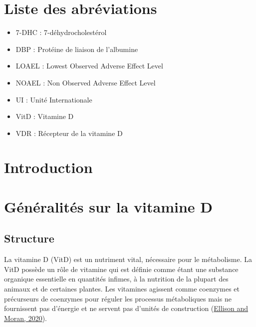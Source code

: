\documentclass[
  letterpaper,
  DIV=11,
  numbers=noendperiod]{scrartcl}
\providecommand{\tightlist}{%
  \setlength{\itemsep}{0pt}\setlength{\parskip}{0pt}}\usepackage{longtable,booktabs,array}
\begin{document}
\hypertarget{liste-des-abruxe9viations}{%
\section*{Liste des abréviations}\label{liste-des-abruxe9viations}}

\begin{itemize}
\tightlist
\item
  7-DHC : 7-déhydrocholestérol
\item
  DBP : Protéine de liaison de l'albumine
\item
  LOAEL : Lowest Observed Adverse Effect Level
\item
  NOAEL : Non Observed Adverse Effect Level
\item
  UI : Unité Internationale
\item
  VitD : Vitamine D
\item
  VDR : Récepteur de la vitamine D
\end{itemize}

\newpage{}

\hypertarget{introduction}{%
\section{Introduction}\label{introduction}}


\newpage{}

\hypertarget{guxe9nuxe9ralituxe9s-sur-la-vitamine-d}{%
\section{Généralités sur la vitamine
D}\label{guxe9nuxe9ralituxe9s-sur-la-vitamine-d}}

\hypertarget{structure}{%
\subsection{Structure}\label{structure}}

La vitamine D (VitD) est un nutriment vital, nécessaire pour le
métabolisme. La VitD possède un rôle de vitamine qui est définie comme
étant une substance organique essentielle en quantités infimes, à la
nutrition de la plupart des animaux et de certaines plantes. Les
vitamines agissent comme coenzymes et précurseurs de coenzymes pour
réguler les processus métaboliques mais ne fournissent pas d'énergie et
ne servent pas d'unités de construction
(\protect\hyperlink{ref-Ellison.2020}{Ellison and Moran, 2020}).
\end{document}
